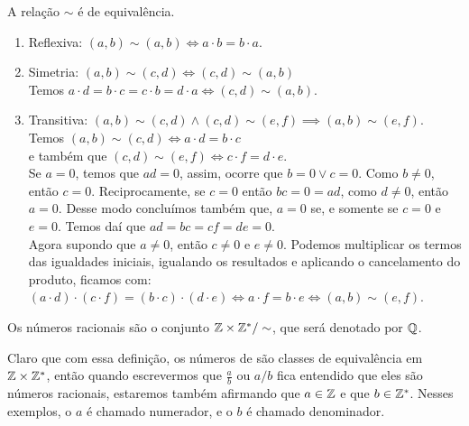 \documentclass[../main.tex]{subfiles}
\begin{document}
\begin{teo}
    A relação $\sim$ é de equivalência.
\end{teo}
\begin{dem}
    \begin{enumerate}[label=(\roman*)]
        \item Reflexiva: $\left( a,b \right) \sim \left( a,b \right) \iff a  \cdot b=b  \cdot a$.
        \item Simetria: $ \left( a ,b \right) \sim \left( c,d \right) \iff \left( c,d \right) \sim \left( a,b \right) $ \\
        Temos $ a  \cdot d = b  \cdot c = c  \cdot b = d  \cdot a \iff \left( c,d \right) \sim \left( a,b \right) $.
        \item Transitiva: $ \left( a,b \right) \sim \left( c,d \right) \land \left( c,d \right) \sim \left( e,f \right) \implies \left( a,b \right) \sim \left( e,f \right)$. \\
        Temos $\left( a,b \right) \sim \left( c,d \right) \iff a  \cdot d=b  \cdot c$ \\
        e também que $\left( c,d \right) \sim \left( e,f \right) \iff c  \cdot f=d  \cdot e$. \\
        Se $a=0$, temos que $ad = 0$, assim, ocorre que $b=0 \lor c=0$. Como $b \neq 0$, então $c=0$. Reciprocamente, se $c=0$ então $bc = 0 = ad$, como $d \neq 0$, então $a=0$. Desse modo concluímos também que, $a=0$ se, e somente se $c=0$ e $e=0$. Temos daí que $ad = bc = cf = de = 0$. \\
        Agora supondo que $a \neq 0$, então $c \neq 0$ e $e \neq 0$.
        Podemos multiplicar os termos das igualdades iniciais, igualando os resultados e aplicando o cancelamento do produto, ficamos com: \\ 
        $\left( a  \cdot d \right)  \cdot \left( c  \cdot f \right)= \left(b  \cdot c\right)  \cdot \left(d  \cdot e\right) \iff a  \cdot f = b  \cdot e \iff \left( a,b \right) \sim \left( e,f \right)$.
    \end{enumerate}
\end{dem}

\begin{defi}
   Os números racionais são o conjunto $\mathbb{Z} \times \mathbb{Z}^* / \sim$, que será denotado por $\mathbb{Q}$.
\end{defi}
Claro que com essa definição, os números de \Q são classes de equivalência em $\mathbb{Z} \times \mathbb{Z}^*$, então quando escrevermos que $\frac{a}{b}$ ou $a/b$ fica entendido que eles são números racionais, estaremos também afirmando que $a \in \mathbb{Z}$ e que $b \in \mathbb{Z}^*$. Nesses exemplos, o $a$ é chamado numerador, e o $b$ é chamado denominador.
\end{document}
